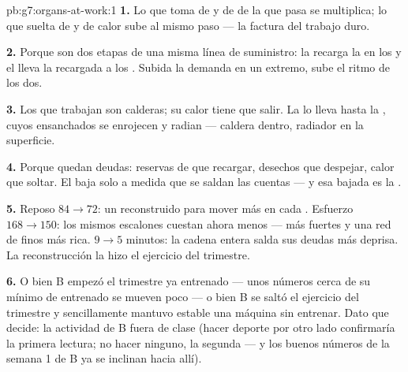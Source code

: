 \begin{solution}{pb:g7:organs-at-work:1}
\textbf{1.} Lo que toma de  y de  de la  que pasa
se multiplica; lo que suelta de  y de calor sube al
mismo paso --- la factura del trabajo duro.

\textbf{2.} Porque son dos etapas de una misma línea de suministro: la
 recarga la  en los  y el  lleva la
 recargada a los . Subida la demanda en un extremo, sube
el ritmo de los dos.

\textbf{3.} Los  que trabajan son calderas; su calor tiene que
salir. La  lo lleva hasta la , cuyos  ensanchados se
enrojecen y radian --- caldera dentro, radiador en la superficie.

\textbf{4.} Porque quedan deudas: reservas de  que recargar,
desechos que despejar, calor que soltar. El  baja solo a medida
que se saldan las cuentas --- y esa bajada es la .

\textbf{5.} Reposo $84 \to 72$: un  reconstruido para mover más
en cada . Esfuerzo $168 \to 150$: los mismos escalones cuestan
ahora menos ---  más fuertes y una red de  finos más rica.
 $9 \to 5$ minutos: la cadena entera salda sus deudas más
deprisa. La reconstrucción la hizo el ejercicio del trimestre.

\textbf{6.} O bien B empezó el trimestre ya entrenado --- unos números
cerca de su mínimo de entrenado se mueven poco --- o bien B se saltó el
ejercicio del trimestre y sencillamente mantuvo estable una máquina sin
entrenar. Dato que decide: la actividad de B fuera de clase (hacer
deporte por otro lado confirmaría la primera lectura; no hacer ninguno,
la segunda --- y los buenos números de la semana 1 de B ya se inclinan
hacia allí).


\end{solution}
